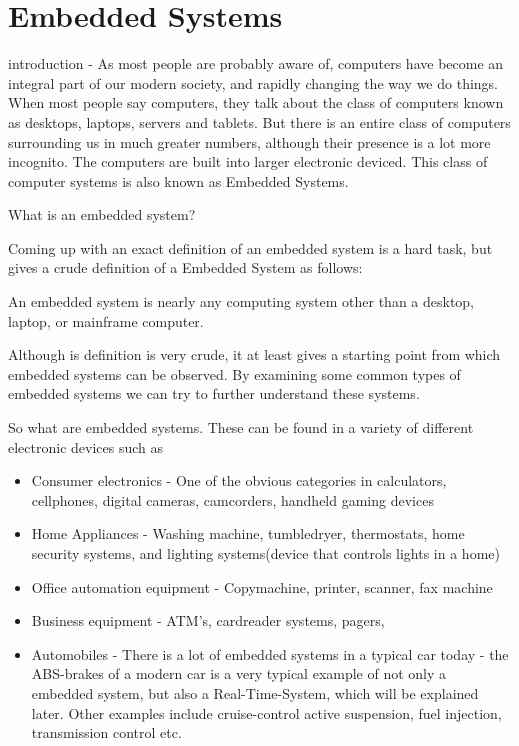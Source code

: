 \section{Embedded Systems}
introduction - As most people are probably aware of, computers have become an integral part of our modern society,
and rapidly changing the way we do things. When most people say computers, they talk about the class of computers
known as desktops, laptops, servers and tablets. But there is an entire class of computers surrounding us in much greater numbers,
although their presence is a lot more incognito. The computers are built into larger electronic deviced.
This class of computer systems is also known as Embedded Systems.

What is an embedded system?

Coming up with an exact definition of an embedded system is a hard task, but \citep{vahid1999embedded} gives a crude
definition of a Embedded System as follows: \nl

An  embedded  system  is  nearly  any computing system other than a desktop, laptop, or  mainframe  computer.

Although is definition is very crude, it at least gives a starting point from which embedded systems can be observed.
By examining some common types of embedded systems we can try to further understand these systems.\nl

So what are embedded systems. These can be found in a variety of different electronic devices such as
\begin{itemize}
\item Consumer electronics - One of the obvious categories in calculators, cellphones, digital cameras, camcorders, handheld gaming devices
\item Home Appliances - Washing machine, tumbledryer, thermostats, home security systems, and lighting systems(device that controls lights in a home)
\item Office automation equipment - Copymachine, printer, scanner, fax machine
\item Business equipment - ATM's, cardreader systems, pagers,
\item Automobiles - There is a lot of embedded systems in a typical car today - the ABS-brakes of a modern car is a very typical
example of not only a embedded system, but also a Real-Time-System, which will be explained later. Other examples include cruise-control
active suspension, fuel injection, transmission control etc.
\end{itemize}




